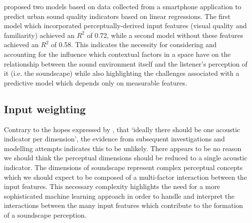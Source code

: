 \citet{Ricciardi2015Sound} proposed two models based on data collected from a smartphone application to predict urban sound quality indicators based on linear regressions. The first model which incorporated perceptually-derived input features (visual quality and familiarity) achieved an $R^2$ of 0.72, while a second model without these features achieved an $R^2$ of 0.58. This indicates the necessity for considering and accounting for the influence which contextual factors in a space have on the relationship between the sound environment itself and the listener's perception of it (i.e. the soundscape) while also highlighting the challenges associated with a predictive model which depends only on measurable features.


\subsection{Input weighting}

Contrary to the hopes expressed by \citet{Aletta2014Towards}, that `ideally there should be one acoustic indicator per dimension', the evidence from subsequent investigations and modelling attempts \citep{Lionello2020systematic} indicates this to be unlikely. There appears to be no reason we should think the perceptual dimensions should be reduced to a single acoustic indicator. The dimensions of soundscape represent complex perceptual concepts which we should expect to be composed of a multi-factor interaction between the input features. This necessary complexity  highlights the need for a more sophisticated machine learning approach in order to handle and interpret the interactions between the many input features which contribute to the formation of a soundscape perception.

